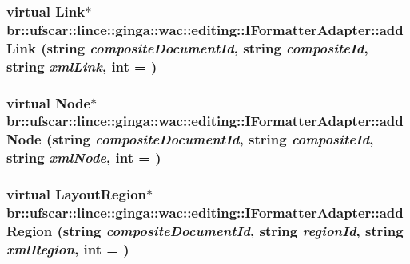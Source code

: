 \label{classbr_1_1ufscar_1_1lince_1_1ginga_1_1wac_1_1editing_1_1IFormatterAdapter_ad7ba323796468d38356e6fe8a22b2f89}
\hypertarget{classbr_1_1ufscar_1_1lince_1_1ginga_1_1wac_1_1editing_1_1IFormatterAdapter_a9bb5ece52056e1837268b92f100573d1}{
\subsubsection[{addLink}]{\setlength{\rightskip}{0pt plus 5cm}virtual Link$\ast$ br::ufscar::lince::ginga::wac::editing::IFormatterAdapter::addLink (string {\em compositeDocumentId}, \/  string {\em compositeId}, \/  string {\em xmlLink}, \/  int = {})}}
\label{classbr_1_1ufscar_1_1lince_1_1ginga_1_1wac_1_1editing_1_1IFormatterAdapter_a9bb5ece52056e1837268b92f100573d1}
\hypertarget{classbr_1_1ufscar_1_1lince_1_1ginga_1_1wac_1_1editing_1_1IFormatterAdapter_a02b1184b86e58e83ea0d7efd8d6a0afa}{
\subsubsection[{addNode}]{\setlength{\rightskip}{0pt plus 5cm}virtual Node$\ast$ br::ufscar::lince::ginga::wac::editing::IFormatterAdapter::addNode (string {\em compositeDocumentId}, \/  string {\em compositeId}, \/  string {\em xmlNode}, \/  int = {})}}
\label{classbr_1_1ufscar_1_1lince_1_1ginga_1_1wac_1_1editing_1_1IFormatterAdapter_a02b1184b86e58e83ea0d7efd8d6a0afa}
\hypertarget{classbr_1_1ufscar_1_1lince_1_1ginga_1_1wac_1_1editing_1_1IFormatterAdapter_a379cbb803df82804f69730a554026081}{
\subsubsection[{addRegion}]{\setlength{\rightskip}{0pt plus 5cm}virtual LayoutRegion$\ast$ br::ufscar::lince::ginga::wac::editing::IFormatterAdapter::addRegion (string {\em compositeDocumentId}, \/  string {\em regionId}, \/  string {\em xmlRegion}, \/  int = {})}}
